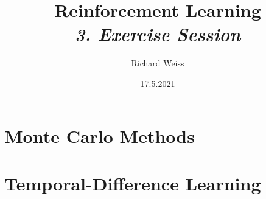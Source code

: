 \documentclass{article}
\title
{
    Reinforcement Learning \\
    \vspace{4pt}
    \normalsize
    \textit{3. Exercise Session}
}
\author{Richard Weiss}
\date{17.5.2021}
\numberwithin{figure}{section}
\begin{document}
\maketitle

\setcounter{section}{3}
\section{Monte Carlo Methods}








\setcounter{section}{5}
\section{Temporal-Difference Learning}









\printbibliography
\end{document}
